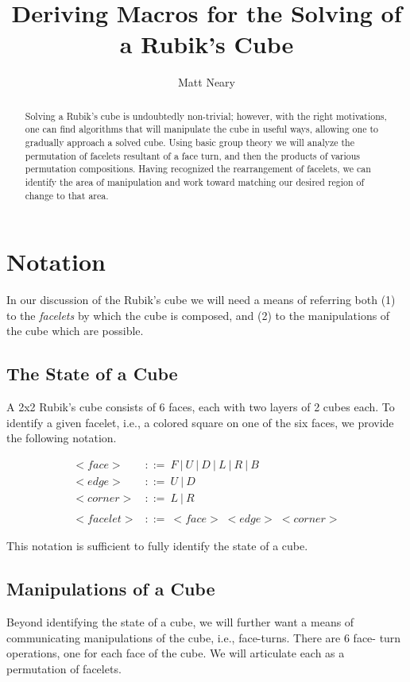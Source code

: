 \documentclass{article}
\begin{document}
\begin{titlepage}
\title{Deriving Macros for the Solving of a Rubik's Cube}
\author{Matt Neary}
\maketitle
\begin{abstract}
Solving a Rubik's cube is undoubtedly non-trivial; however, with the right 
motivations, one can find algorithms that will manipulate the cube in useful 
ways, allowing one to gradually approach a solved cube. Using basic group 
theory we will analyze the permutation of facelets resultant of a face turn, 
and then the products of various permutation compositions. Having recognized 
the rearrangement of facelets, we can identify the area of manipulation and 
work toward matching our desired region of change to that area.
\end{abstract}
\end{titlepage}

\section{Notation}
In our discussion of the Rubik's cube we will need a means of referring both 
(1) to the \emph{facelets} by which the cube is composed, and (2) to the 
manipulations of the cube which are possible.

\subsection{The State of a Cube}
A 2x2 Rubik's cube consists of 6 faces, each with two layers of 2 cubes each. 
To identify a given facelet, i.e., a colored square on one of the six faces, 
we provide the following notation.

\begin{align*}
	<face> & ::= \ F\ |\ U\ |\ D\ |\ L\ |\ R\ |\ B
\\	<edge> & ::= \ U\ |\ D
\\	<corner> & ::= \ L\ |\ R
\\
\\	<facelet> & ::= \ <face> \; <edge> \; <corner>
\end{align*}

This notation is sufficient to fully identify the state of a cube.

\subsection{Manipulations of a Cube}
Beyond identifying the state of a cube, we will further want a means of 
communicating manipulations of the cube, i.e., face-turns. There are 6 face-
turn operations, one for each face of the cube. We will articulate each as a 
permutation of facelets.
\end{document}
